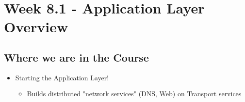 \documentclass[12pt]{ctexart}   %
\begin{document}
	
\section{Week 8.1 - Application Layer Overview}
	\subsection{Where we are in the Course}
	\begin{itemize}
		\item Starting the Application Layer!
		\begin{itemize}
			\item Builds distributed "network services" (DNS, Web) on Transport services
		\end{itemize}
	\end{itemize}
	
\end{document}
